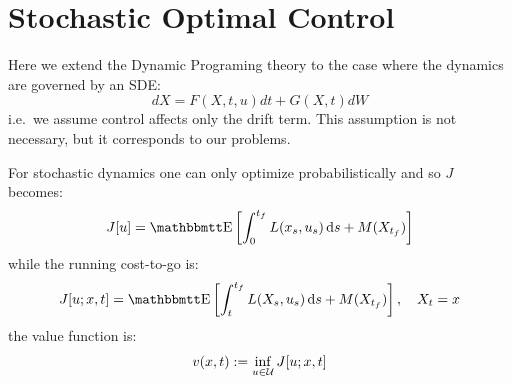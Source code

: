\documentclass{article}
\begin{document}
\section{Stochastic Optimal Control}
Here we extend the Dynamic Programing theory to the case where the dynamics are
governed by an SDE:
\begin{equation}
dX = F(X,t, u) dt + G(X,t) dW
\end{equation} 
i.e.\ we assume control affects only the drift term. This 
assumption is not necessary, but it corresponds to our problems.

For stochastic dynamics one can only optimize probabilistically and so
$J$ becomes:
\begin{equation}
J[u] = \Exp \left[ \int_0^\tf L(x_s, u_s) \intd{s} + M(X_\tf)
\right] 
\label{eq:generic_objective_function_stochastic}
\end{equation}
while the running cost-to-go is:
\begin{equation}
J[u; x, t] = \Exp \left[ \int_t^\tf L(X_s, u_s) \intd{s} + M(X_\tf) \right], 
\quad X_t = x
\label{eq:generic_cost_to_go_stochastic}
\end{equation}
the value function is:
\begin{equation}
v(x,t) := \inf_{u \in { \mathcal{U} }} J[u; x,t]
\end{equation}
\end{document}
